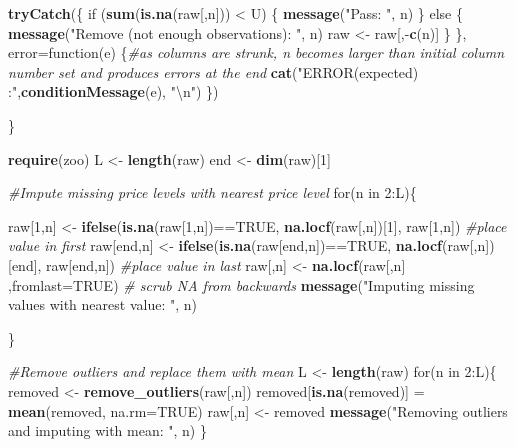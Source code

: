 \documentclass[]{elsarticle} %
\newenvironment{Shaded}{\begin{snugshade}}{\end{snugshade}}
\newcommand{\KeywordTok}[1]{\textcolor[rgb]{0.13,0.29,0.53}{\textbf{{#1}}}}
\newcommand{\DataTypeTok}[1]{\textcolor[rgb]{0.13,0.29,0.53}{{#1}}}
\newcommand{\DecValTok}[1]{\textcolor[rgb]{0.00,0.00,0.81}{{#1}}}
\newcommand{\CharTok}[1]{\textcolor[rgb]{0.31,0.60,0.02}{{#1}}}
\newcommand{\StringTok}[1]{\textcolor[rgb]{0.31,0.60,0.02}{{#1}}}
\newcommand{\CommentTok}[1]{\textcolor[rgb]{0.56,0.35,0.01}{\textit{{#1}}}}
\newcommand{\OtherTok}[1]{\textcolor[rgb]{0.56,0.35,0.01}{{#1}}}
\newcommand{\NormalTok}[1]{{#1}}
\begin{document}
\begin{Shaded}
\begin{Highlighting}[]
  \KeywordTok{tryCatch}\NormalTok{(\{}
        \NormalTok{if (}\KeywordTok{sum}\NormalTok{(}\KeywordTok{is.na}\NormalTok{(raw[,n])) <}\StringTok{ }\NormalTok{U) \{}
                        \KeywordTok{message}\NormalTok{(}\StringTok{"Pass: "}\NormalTok{, n)}
        \NormalTok{\} else \{}
                      \KeywordTok{message}\NormalTok{(}\StringTok{"Remove (not enough observations): "}\NormalTok{, n)}
                        \NormalTok{raw <-}\StringTok{ }\NormalTok{raw[,-}\KeywordTok{c}\NormalTok{(n)]}
        \NormalTok{\}}
    \NormalTok{\}, }\DataTypeTok{error=}\NormalTok{function(e)    \{}\CommentTok{#as columns are strunk, n becomes larger than initial column number set and produces errors at the end}
    \KeywordTok{cat}\NormalTok{(}\StringTok{"ERROR(expected) :"}\NormalTok{,}\KeywordTok{conditionMessage}\NormalTok{(e), }\StringTok{"}\CharTok{\textbackslash{}n}\StringTok{"}\NormalTok{)}
    \NormalTok{\})}

\NormalTok{\}}

\KeywordTok{require}\NormalTok{(zoo)}
\NormalTok{L <-}\StringTok{ }\KeywordTok{length}\NormalTok{(raw)}
\NormalTok{end <-}\StringTok{ }\KeywordTok{dim}\NormalTok{(raw)[}\DecValTok{1}\NormalTok{]}

\CommentTok{#Impute missing price levels with nearest price level}
\NormalTok{for(n in }\DecValTok{2}\NormalTok{:L)\{}

\NormalTok{raw[}\DecValTok{1}\NormalTok{,n] <-}\StringTok{ }\KeywordTok{ifelse}\NormalTok{(}\KeywordTok{is.na}\NormalTok{(raw[}\DecValTok{1}\NormalTok{,n])==}\OtherTok{TRUE}\NormalTok{, }\KeywordTok{na.locf}\NormalTok{(raw[,n])[}\DecValTok{1}\NormalTok{], raw[}\DecValTok{1}\NormalTok{,n]) }\CommentTok{#place value in first }
\NormalTok{raw[end,n] <-}\StringTok{ }\KeywordTok{ifelse}\NormalTok{(}\KeywordTok{is.na}\NormalTok{(raw[end,n])==}\OtherTok{TRUE}\NormalTok{, }\KeywordTok{na.locf}\NormalTok{(raw[,n])[end], raw[end,n]) }\CommentTok{#place value in last}
\NormalTok{raw[,n] <-}\StringTok{ }\KeywordTok{na.locf}\NormalTok{(raw[,n] ,}\DataTypeTok{fromlast=}\OtherTok{TRUE}\NormalTok{) }\CommentTok{# scrub NA from backwards}
\KeywordTok{message}\NormalTok{(}\StringTok{"Imputing missing values with nearest value: "}\NormalTok{, n)}

\NormalTok{\}}

\CommentTok{#Remove outliers and replace them with mean}
\NormalTok{L <-}\StringTok{ }\KeywordTok{length}\NormalTok{(raw)}
\NormalTok{for(n in }\DecValTok{2}\NormalTok{:L)\{}
            \NormalTok{removed <-}\StringTok{ }\KeywordTok{remove_outliers}\NormalTok{(raw[,n])}
            \NormalTok{removed[}\KeywordTok{is.na}\NormalTok{(removed)] =}\StringTok{ }\KeywordTok{mean}\NormalTok{(removed, }\DataTypeTok{na.rm=}\OtherTok{TRUE}\NormalTok{)}
            \NormalTok{raw[,n] <-}\StringTok{ }\NormalTok{removed}
            \KeywordTok{message}\NormalTok{(}\StringTok{"Removing outliers and imputing with mean: "}\NormalTok{, n)}
            \NormalTok{\}}


\end{Highlighting}
\end{Shaded}
\end{document}

